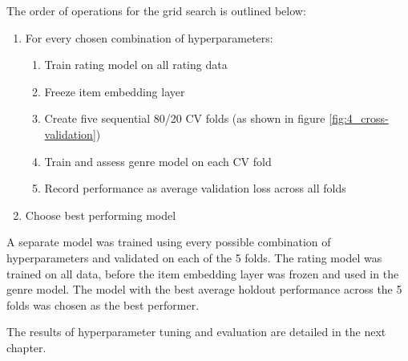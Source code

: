 The order of operations for the grid search is outlined below:

\begin{enumerate}
  \item For every chosen combination of hyperparameters:
  \begin{enumerate}
    \item Train rating model on all rating data
    \item Freeze item embedding layer
    \item Create five sequential 80/20 CV folds (as shown in figure \ref{fig:4_cross-validation})
    \item Train and assess genre model on each CV fold
    \item Record performance as average validation loss across all folds
  \end{enumerate}
  \item Choose best performing model
\end{enumerate}

A separate model was trained using every possible combination of hyperparameters and validated on each of the 5 folds. The rating model was trained on all data, before the item embedding layer was frozen and used in the genre model. The model with the best average holdout performance across the 5 folds was chosen as the best performer.

The results of hyperparameter tuning and evaluation are detailed in the next chapter.